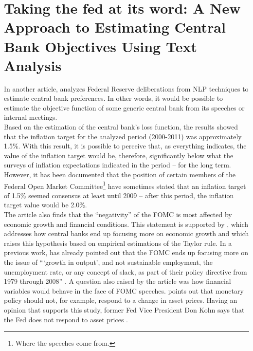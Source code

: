\section{Taking the fed at its word: A New Approach to Estimating Central Bank Objectives Using Text Analysis}

In another article, \cite{shapiro2021taking} analyzes Federal Reserve deliberations from NLP techniques to estimate central bank preferences. In other words, it would be possible to estimate the objective function of some generic central bank from its speeches or internal meetings.\\

Based on the estimation of the central bank's loss function, the results showed that the inflation target for the analyzed period (2000-2011) was approximately 1.5\%. With this result, it is possible to perceive that, as everything indicates, the value of the inflation target would be, therefore, significantly below what the surveys of inflation expectations indicated in the period -- for the long term. However, it has been documented \cite[p.32]{shapiro2021taking} that the position of certain members of the Federal Open Market Committee\footnote{Where the speeches come from.} have sometimes stated that an inflation target of 1.5\% seemed consensus at least until 2009 -- after this period, the inflation target value would be 2.0\%.\\

The article also finds that the ``negativity'' of the FOMC is most affected by economic growth and financial conditions. This statement is supported by \cite{walsh2003speed}, which addresses how central banks end up focusing more on economic growth and \cite{coibion2011monetary} which raises this hypothesis based on empirical estimations of the Taylor rule. In a previous work, \cite{thornton2011does} has already pointed out that the FOMC ends up focusing more on the issue of ```growth in output', and not sustainable employment, the unemployment rate, or any concept of slack, as part of their policy directive from 1979 through 2008'' \cite[p.34]{shapiro2021taking}. A question also raised by the article was how financial variables would behave in the face of FOMC speeches. \cite{bernanke2001should} points out that monetary policy should not, for example, respond to a change in asset prices. Having an opinion that supports this study, former Fed Vice President Don Kohn says that the Fed does not respond to asset prices \cite{kohn2006monetary, kohn2009monetary}.\\


